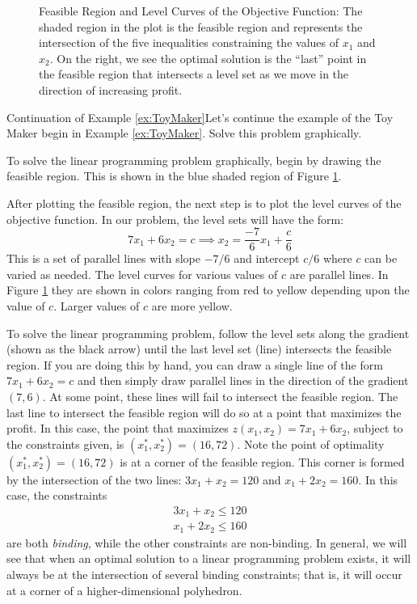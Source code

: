 \begin{figure}[H]
\caption{Feasible Region and Level Curves of the Objective Function: The shaded region in the plot is the feasible region and represents the intersection of the five inequalities constraining the values of $x_1$ and $x_2$. On the right, we see the optimal solution is the ``last'' point in the feasible region that intersects a level set as we move in the direction of increasing profit.}
\label{fig:ToyExampleFeasibleRegion}
\end{figure}

\begin{example}{Continuation of Example \ref{ex:ToyMaker}}{}Let's continue the example of the Toy Maker begin in Example \ref{ex:ToyMaker}.  Solve this problem graphically.
\end{example}
\begin{solution} To solve the linear programming problem graphically, begin by drawing the feasible region. This is shown in the blue shaded region of Figure \ref{fig:ToyExampleFeasibleRegion}. 


After plotting the feasible region, the next step is to plot the level curves of the objective function. In our problem, the level sets will have the form:
\begin{displaymath}
7x_1 + 6x_2 = c \implies x_2 = \frac{-7}{6}x_1 + \frac{c}{6}
\end{displaymath}
This is a set of parallel lines with slope $-7/6$ and intercept $c/6$ where $c$ can be varied as needed. The level curves for various values of $c$ are parallel lines. In Figure \ref{fig:ToyExampleFeasibleRegion} they are shown in colors ranging from red to yellow depending upon the value of $c$. Larger values of $c$ are more yellow. 

To solve the linear programming problem, follow the level sets along the gradient (shown as the black arrow) until the last level set (line) intersects the feasible region. If you are doing this by hand, you can draw a single line of the form $7x_1 + 6x_2 = c$ and then simply draw parallel lines in the direction of the gradient $(7,6)$. At some point, these lines will fail to intersect the feasible region. The last line to intersect the feasible region will do so at a point that maximizes the profit. In this case, the point that maximizes $z(x_1,x_2) = 7x_1 + 6x_2$, subject to the constraints given, is $(x_1^*, x_2^*) = (16,72)$. 
\newpage
Note the point of optimality $(x_1^*, x_2^*) = (16,72)$ is at a corner of the feasible region. This corner is formed by the intersection of the two lines: $3x_1 + x_2 = 120$ and $x_1 + 2x_2 = 160$. In this case, the constraints 
\begin{gather*}
3x_1 + x_2 \leq 120\\
x_1 + 2x_2 \leq 160
\end{gather*}
are both \textit{binding}, while the other constraints are non-binding. In general, we will see that when an optimal solution to a linear programming problem exists, it will always be at the intersection of several binding constraints; that is, it will occur at a corner of a higher-dimensional polyhedron.  
\end{solution}

